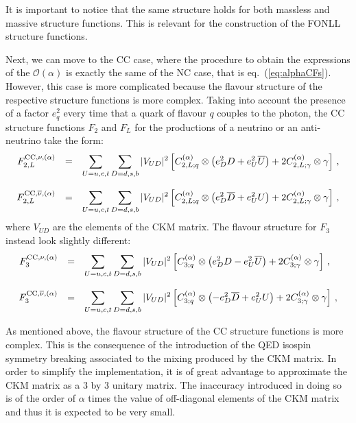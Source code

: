 It is important to notice that the same structure holds for both
massless and massive structure functions. This is relevant for the
construction of the FONLL structure functions.

Next, we can move to the CC case, where
the procedure to obtain the expressions of the
$\mathcal{O}(\alpha)$ is exactly the same of the NC case, that is
eq.~(\ref{eq:alphaCFs}). However, this case is more complicated
because the flavour structure of the respective structure functions is
more complex. Taking into account the presence of a factor $e_q^2$
every time that a quark of flavour $q$ couples to the photon, the CC
structure functions $F_2$ and $F_L$ for the productions of a neutrino
or an anti-neutrino take the form:
\begin{equation}\label{compactNu}
\begin{array}{rcl}
F_{2,L}^{{\rm CC},\nu,(\alpha)} &=& \displaystyle
                              \sum_{U=u,c,t}\sum_{D=d,s,b}|V_{UD}|^2\left[C_{2,L;q}^{(\alpha)}\otimes\left(e_D^2D +e_U^2\overline{U}\right) +2 C_{2,L;\gamma}^{(\alpha)}\otimes\gamma\right]\,,\\
\\
F_{2,L}^{{\rm CC},\overline{\nu},(\alpha)} &=& \displaystyle
\sum_{U=u,c,t}\sum_{D=d,s,b}|V_{UD}|^2\left[C_{2,L;q}^{(\alpha)}\otimes\left(e_D^2\overline{D}
    +e_U^2U\right) +2 C_{2,L;\gamma}^{(\alpha)}\otimes\gamma\right]\,,
\end{array}
\end{equation}
where $V_{UD}$ are the elements of the CKM matrix. The flavour
structure for $F_3$ instead look slightly different:
\begin{equation}\label{compactNuF3}
\begin{array}{rcl}
F_3^{{\rm CC},\nu,(\alpha)} &=& \displaystyle
                              \sum_{U=u,c,t}\sum_{D=d,s,b}|V_{UD}|^2\left[C_{3;q}^{(\alpha)}\otimes\left(e_D^2D -e_U^2\overline{U}\right) +2 C_{3;\gamma}^{(\alpha)}\otimes\gamma\right]\,,\\
\\
F_3^{{\rm CC},\overline{\nu},(\alpha)} &=& \displaystyle
\sum_{U=u,c,t}\sum_{D=d,s,b}|V_{UD}|^2\left[C_{3;q}^{(\alpha)}\otimes\left(-e_D^2\overline{D}
    +e_U^2U\right) +2 C_{3;\gamma}^{(\alpha)}\otimes\gamma\right]\,,
\end{array}
\end{equation}

As mentioned above, the flavour structure of the CC structure
functions is more complex. This is the consequence of the introduction
of the QED isospin symmetry breaking associated to the mixing produced
by the CKM matrix. In order to simplify the implementation, it is of
great advantage to approximate the CKM matrix as a 3 by 3 unitary
matrix. The inaccuracy introduced in doing so is of the order of
$\alpha$ times the value of off-diagonal elements of the CKM matrix
and thus it is expected to be very small.

